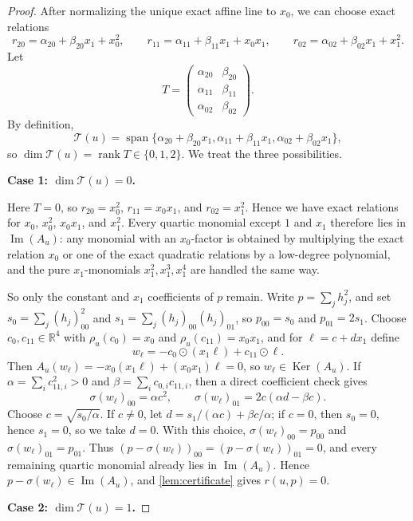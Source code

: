 \documentclass[10pt]{article}
\theoremstyle{definition}
\newcommand{\R}{\mathbb{R}}
\DeclareMathOperator{\mspan}{span}
\DeclareMathOperator{\imag}{Im}
\DeclareMathOperator{\kernel}{Ker}
\DeclareMathOperator{\rank}{rank}
\newcommand{\Span}{\mspan}
\newcommand{\im}{\imag}
\newcommand{\Ker}{\kernel}
\newcommand{\sig}{\sigma}
\newcommand{\rel}{\rho}
\newcommand{\Tail}{\mathcal{T}}
\begin{document}
\begin{proof}
After normalizing the unique exact affine line to \(x_0\), we can choose exact
relations
\[
  r_{20}=\alpha_{20}+\beta_{20}x_1+x_0^2,\qquad
  r_{11}=\alpha_{11}+\beta_{11}x_1+x_0x_1,\qquad
  r_{02}=\alpha_{02}+\beta_{02}x_1+x_1^2.
\]
Let
\[
  T=
  \begin{pmatrix}
    \alpha_{20} & \beta_{20}\\
    \alpha_{11} & \beta_{11}\\
    \alpha_{02} & \beta_{02}
  \end{pmatrix}.
\]
By definition,
\[
  \Tail(u)=\Span\{\alpha_{20}+\beta_{20}x_1,\alpha_{11}+\beta_{11}x_1,
  \alpha_{02}+\beta_{02}x_1\},
\]
so \(\dim \Tail(u)=\rank T\in \{0,1,2\}\). We treat the three possibilities.

\smallskip
\noindent\textbf{Case 1: \(\dim \Tail(u)=0\).}

Here \(T=0\), so \(r_{20}=x_0^2\), \(r_{11}=x_0x_1\), and \(r_{02}=x_1^2\).
Hence we have exact relations for \(x_0\), \(x_0^2\), \(x_0x_1\), and
\(x_1^2\). Every quartic monomial except \(1\) and \(x_1\) therefore lies in
\(\im(A_u)\): any monomial with an \(x_0\)-factor is obtained by multiplying
the exact relation \(x_0\) or one of the exact quadratic relations by a
low-degree polynomial, and the pure \(x_1\)-monomials \(x_1^2,x_1^3,x_1^4\) are
handled the same way.

So only the constant and \(x_1\) coefficients of \(p\) remain. Write
\(p=\sum_j h_j^2\), and set \(s_0=\sum_j (h_j)_{00}^2\) and
\(s_1=\sum_j (h_j)_{00}(h_j)_{01}\), so \(p_{00}=s_0\) and \(p_{01}=2s_1\).
Choose \(c_0,c_{11}\in \R^4\) with \(\rel_u(c_0)=x_0\) and
\(\rel_u(c_{11})=x_0x_1\), and for \(\ell=c+d x_1\) define
\[
  w_\ell=-c_0\odot (x_1\ell)+c_{11}\odot \ell.
\]
Then \(A_u(w_\ell)=-x_0(x_1\ell)+(x_0x_1)\ell=0\), so \(w_\ell\in \Ker(A_u)\).
If \(\alpha=\sum_i c_{11,i}^2>0\) and \(\beta=\sum_i c_{0,i}c_{11,i}\), then a
direct coefficient check gives
\[
  \sig(w_\ell)_{00}=\alpha c^2,\qquad
  \sig(w_\ell)_{01}=2c(\alpha d-\beta c).
\]
Choose \(c=\sqrt{s_0/\alpha}\). If \(c\neq 0\), let
\(d=s_1/(\alpha c)+\beta c/\alpha\); if \(c=0\), then \(s_0=0\), hence
\(s_1=0\), so we take \(d=0\). With this choice,
\(\sig(w_\ell)_{00}=p_{00}\) and \(\sig(w_\ell)_{01}=p_{01}\). Thus
\((p-\sig(w_\ell))_{00}=(p-\sig(w_\ell))_{01}=0\), and every remaining quartic
monomial already lies in \(\im(A_u)\). Hence \(p-\sig(w_\ell)\in \im(A_u)\),
and \cref{lem:certificate} gives \(r(u,p)=0\).

\smallskip
\noindent\textbf{Case 2: \(\dim \Tail(u)=1\).}


\end{proof}
\end{document}
